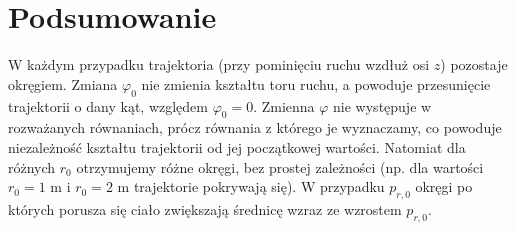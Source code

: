 \documentclass[11pt]{article}
\begin{document}
\section*{Podsumowanie}
W każdym przypadku trajektoria (przy pominięciu ruchu wzdłuż osi $z$) pozostaje okręgiem. Zmiana $\varphi_0$ nie zmienia 
kształtu toru ruchu, a powoduje przesunięcie trajektorii o dany kąt, względem $\varphi_0=0$. Zmienna $\varphi$ nie występuje w rozważanych 
równaniach, prócz równania z którego je wyznaczamy, co powoduje niezależność kształtu trajektorii od jej początkowej wartości. Natomiat dla różnych $r_0$ 
otrzymujemy różne okręgi, bez prostej zależności (np. dla wartości $r_0=1$ m i $r_0=2$ m trajektorie pokrywają się). W przypadku $p_{r,0}$ okręgi po których 
porusza się ciało zwiększają średnicę wzraz ze wzrostem $p_{r,0}$.
\end{document}
